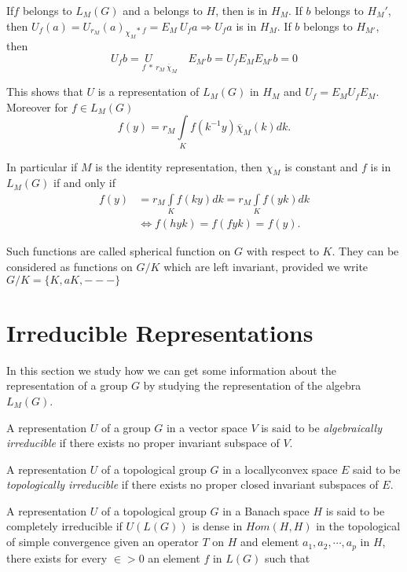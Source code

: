 If\pageoriginale $f$ belongs to $L_M(G)$ and a belongs to $H$, then  is in $H_M$. If
$b$ belongs to $H_M'$, then $U_f(a)=U_{r_M}(a)_{\chi_M}{}_{\ast~f}=E_M
~U_fa \Rightarrow U_f a$ is in $H_M$. If $b$ belongs to $H_{M'}$, then 
$$ 
 U_fb  =\underset{f~\ast~ r_M~\overline{\chi}_M}{U\qquad } \quad E_{M'} b= U_f
 E_M E_{M'} b=0
$$

This shows that $U$ is a representation of $L_M(G)$ in $H_M$ and
$U_f=E_M U_f E_M$. Moreover for $f \in L_M(G)$  
$$
f(y)=r_M \int\limits_{K} f(k^{-1}y) \overline{\chi}_M (k)dk.
$$

In particular if $M$ is the identity representation, then $\chi_M$ is
constant and $f$ is in $L_M(G)$ if and only if  
\begin{align*}
  f(y)&=r_M \int\limits_{K} f(ky)dk=r_M \int\limits_{K} f(yk)dk\\
  &\Longleftrightarrow f(hyk)=f(fyk)=f(y).
\end{align*} 
 
Such functions are called spherical function on $G$ with respect to
$K$. They can be considered as functions on $G/K$ which are left
invariant, provided we write $G/K=\{ K,aK,---\}$ 

 \section{Irreducible Representations}\label{part2:chap1:sec2}
 
 In this section we study how we can get some information about the
 representation of a group $G$ by studying the representation of the
 algebra $L_M(G)$.  

\setcounter{definition}{0}
\begin{definition}\label{part2:chap1:sec2:def1}
  A representation $U$ of a group $G$ in a vector space $V$ is said to
  be \textit {algebraically irreducible} if there exists no proper
  invariant subspace of $V$.  
\end{definition} 
 
\begin{definition}\label{part2:chap1:sec2:def2}
  A representation $U$ of a topological group $G$ in a
  locally\pageoriginale convex 
  space $E$ said to be \textit{topologically irreducible} if there
  exists no proper closed invariant subspaces of $E$. 
\end{definition} 
 
\begin{definition}\label{part2:chap1:sec2:def3}
  A representation $U$ of a topological group $G$ in a Banach space
  $H$ is said to be completely irreducible if $U(L(G))$ is dense in
  $Hom(H,H)$ in the topological of simple convergence \iec  given an
  operator $T$ on $H$ and element $a_1,a_2,\cdots, a_p$ in $H$, there
  exists for every $\in > 0$ an element $f$ in $L(G)$ such that  
 \end{definition}  
 
